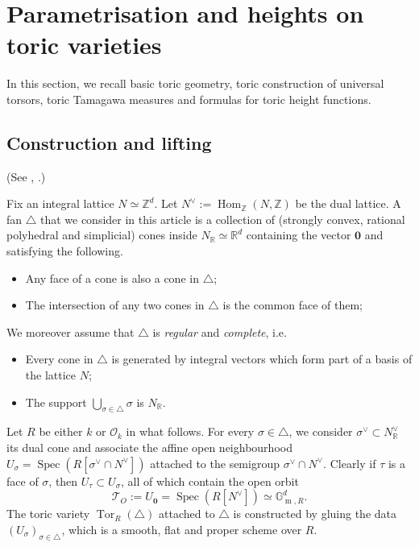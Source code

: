 \documentclass[11pt,letterpaper]{amsart}
\newcommand{\BR}{{\mathbb {R}}}
\newcommand{\BZ}{{\mathbb {Z}}}
\newcommand{\CO}{{\mathcal {O}}}
\newcommand{\CT}{{\mathcal {T}}}
\theoremstyle{plain}
\numberwithin{equation}{section}
\theoremstyle{definition}
\theoremstyle{remark}
\begin{document}
\section{Parametrisation and heights on toric varieties}\label{se:toricparaheight}
In this section, we recall basic toric geometry, toric construction of universal torsors, toric Tamagawa measures and formulas for toric height functions. 
\subsection{Construction and lifting}
(See \cite[\S8]{Salberger}, \cite[\S2]{Huang}.)

Fix an integral lattice $N\simeq \BZ^d$. Let $N^\vee:=\operatorname{Hom}_\BZ(N,\BZ)$ be the dual lattice.  A fan $\triangle$ that we consider in this article is a collection of (strongly convex, rational polyhedral and simplicial) cones inside $N_\BR\simeq \BR^d$ containing the vector $\mathbf{0}$ and satisfying the following.
\begin{itemize}
	\item Any face of a cone is also a cone in $\triangle$;
	\item The intersection of any two cones in $\triangle$ is the common face of them;
\end{itemize}
We moreover assume that $\triangle$ is \emph{regular} and \emph{complete}, i.e.
\begin{itemize}
	\item Every cone in $\triangle$ is generated by integral vectors which form part of a basis of the lattice $N$;
	\item The support $\bigcup_{\sigma\in\triangle}\sigma$ is $N_\BR$.
\end{itemize}

Let $R$ be either $k$ or $\CO_k$ in what follows. For every $\sigma\in\triangle$, we consider  $\sigma^\vee\subset N^\vee_\BR$ its dual cone and associate the affine open neighbourhood $U_\sigma=\operatorname{Spec}(R[\sigma^\vee\cap N^\vee])$ attached to the semigroup $\sigma^\vee\cap N^\vee$. Clearly if $\tau$ is a face of $\sigma$, then $U_\tau\subset U_\sigma$, all of which contain the open orbit \begin{equation}\label{eq:openorbit}
	\CT_{O}:=U_{\mathbf{0}}=\operatorname{Spec}(R[N^\vee])\simeq \mathbb{G}_{\operatorname{m},R}^d.
\end{equation}  
The toric variety $\operatorname{Tor}_R(\triangle)$ attached to $\triangle$ is constructed by gluing the data $(U_\sigma)_{\sigma\in\triangle}$, which is a smooth, flat and proper scheme over $R$.
\end{document}
